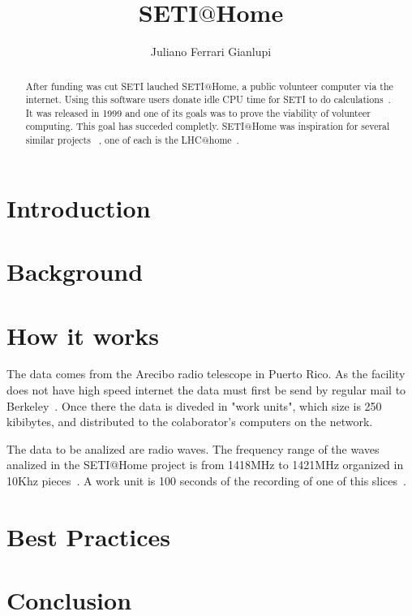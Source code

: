 \title{SETI$@$Home}

\author{Juliano Ferrari Gianlupi}


\renewcommand{\shortauthors}{J. F. Gianlupi}


\begin{abstract}
After funding was cut SETI lauched SETI$@$Home, a public volunteer computer 
via the internet. Using this software users donate idle CPU time for SETI to do 
calculations~\cite{www-hid-sp18-601-sathome-about}. It was released in 1999 and 
one of its goals was to prove the viability of volunteer computing. This goal 
has succeded completly. SETI$@$Home was inspiration for several similar projects
 ~\cite{www-hid-sp18-601-boinc-projects}, one of each is the 
 LHC$@$home~\cite{www-hid-sp18-601-lhc-at-home-history}.
\end{abstract}



\maketitle

\section{Introduction}

\section{Background}

\section{How it works}

The data comes from the Arecibo radio telescope in Puerto Rico. As the facility
does not have high speed internet the data must first be send by regular mail to
 Berkeley~\cite{www-hid-sp18-601-sathome-howworks}. Once there the data is 
 diveded in "work units", which size is 250 kibibytes, and distributed to the 
 colaborator's computers on the network.

The data to be analized are radio waves. The frequency range of the waves 
analized in the SETI$@$Home project is from 1418MHz to 1421MHz organized in 
10Khz pieces~\cite{aper-hid-sp18-601-anderson2002seti}. A work unit is 100 
seconds of the recording of one of this 
slices~\cite{www-hid-sp18-601-sathome-howworks}.
 

\section{Best Practices}


\section{Conclusion}

\begin{acks}

\end{acks}


 

